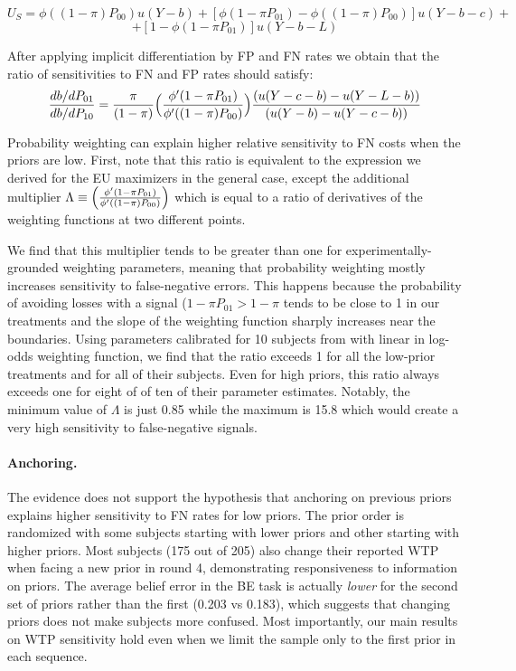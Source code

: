 \documentclass[12pt,a4paper]{article}
\newcommand{\aut}[1]{{\color{Red}#1}}
\begin{document}
\[ U_S = \phi((1-\pi) P_{00})u(Y-b)+[\phi(1-\pi P_{01})-\phi((1-\pi)P_{00})]u(Y-b-c)+\]
\[+[1-\phi(1-\pi P_{01})]u(Y-b-L)\]

After applying implicit differentiation by FP and FN rates we obtain that the ratio of sensitivities to FN and FP rates should satisfy:
\begin{equation}
{db / dP_{01}  \over db / dP_{10}} = {\pi \over (1-\pi)} \Bigl({\phi'(1-\pi P_{01}) \over \phi'((1-\pi)P_{00})}\Bigr) {(u(Y-c-b)-u(Y-L-b))\over (u(Y-b)-u(Y-c-b))}
\end{equation}


Probability weighting can explain higher relative sensitivity to FN costs when the priors are low. First, note that this ratio is equivalent to the expression we derived for the EU maximizers in the general case, except the additional multiplier $\Lambda\equiv \Bigl({\phi'(1-\pi P_{01}) \over \phi'((1-\pi)P_{00})}\Bigr)$ which is equal to a ratio of derivatives of the weighting functions at two different points. 

We find that this multiplier tends to be greater than one for \aut{experimentally-grounded} weighting parameters, meaning that probability weighting mostly increases sensitivity to false-negative errors. This happens because the probability of avoiding losses with a signal ($1-\pi P_{01}>1-\pi$ tends to be close to 1 in our treatments and the slope of the weighting function sharply increases near the boundaries. Using parameters calibrated for 10 subjects from \citet{gonzalez_shape_1999} with linear in log-odds weighting function, we find that the ratio exceeds 1 for all the low-prior treatments and for all of their subjects. Even for high priors, this ratio always exceeds one for eight of of ten of their parameter estimates. Notably, the minimum value of $\Lambda$ is just 0.85 while the maximum is 15.8 which would create a very high sensitivity to false-negative signals.

\paragraph{Anchoring.} The evidence does not support the hypothesis that anchoring on previous priors explains higher sensitivity to FN rates for low priors. The prior order is randomized with some subjects starting with lower priors and other starting with higher priors. Most subjects (175 out of 205) also change their reported WTP when facing a new prior in round 4, demonstrating responsiveness to information on priors. The average belief error in the BE task is actually \emph{lower} for the second set of priors rather than the first (0.203 vs 0.183), which suggests that changing priors does not make subjects more confused. Most importantly, our main results on WTP sensitivity hold even when we limit the sample only to the first prior in each sequence.
\end{document}
